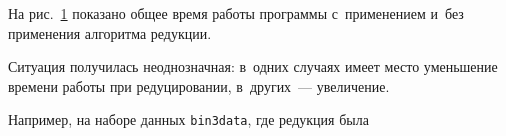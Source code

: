 \begin{figure}
\begin{minipage}[t]{60mm}

\label{fig:time}

\end{minipage}

\vspace*{-12pt}

\end{figure}







На рис.~\ref{fig:time} показано общее время работы программы с~применением и~без применения алгоритма редукции. 

Ситуация получилась неоднозначная: в~одних случаях имеет мес\-то уменьшение времени работы при редуцировании, в~других~--- увеличение. 

Например, на наборе данных \texttt{bin3data}, где редукция была\linebreak\vspace*{-12pt}



\pagebreak



\



\vspace*{-12pt}












